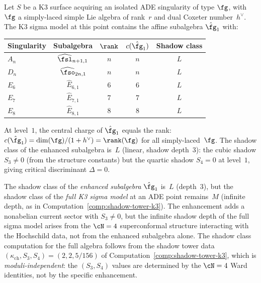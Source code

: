\begin{proposition}
\label{prop:k3-ade-enhancement}
Let $S$ be a K3 surface acquiring an isolated ADE singularity of
type $\fg$, with $\fg$ a simply-laced simple Lie algebra of rank~$r$
and dual Coxeter number~$h^\vee$.
The K3 sigma model at this point contains the affine subalgebra
$\hat{\fg}_1$ with:
\begin{center}
\renewcommand{\arraystretch}{1.3}
\begin{tabular}{lcccc}
\toprule
\textbf{Singularity} & \textbf{Subalgebra} & $\rank$ & $c(\hat{\fg}_1)$ & \textbf{Shadow class} \\
\midrule
$A_n$ & $\widehat{\fsl}_{n+1,1}$ & $n$ & $n$ & $L$ \\
$D_n$ & $\widehat{\fso}_{2n,1}$ & $n$ & $n$ & $L$ \\
$E_6$ & $\hat{E}_{6,1}$ & $6$ & $6$ & $L$ \\
$E_7$ & $\hat{E}_{7,1}$ & $7$ & $7$ & $L$ \\
$E_8$ & $\hat{E}_{8,1}$ & $8$ & $8$ & $L$ \\
\bottomrule
\end{tabular}
\end{center}
At level~$1$, the central charge of $\hat{\fg}_1$ equals the rank:
$c(\hat{\fg}_1) = \dim(\fg)/(1 + h^\vee) = \rank(\fg)$ for all
simply-laced~$\fg$. The shadow class of the enhanced subalgebra is~$L$
\textup{(}linear, shadow depth~$3$\textup{)}: the cubic shadow $S_3 \neq 0$
\textup{(}from the structure constants\textup{)} but the quartic shadow
$S_4 = 0$ at level~$1$, giving critical discriminant $\Delta = 0$.
\end{proposition}

\begin{remark}
\label{rem:k3-ade-shadow-subalgebra-vs-full}
The shadow class of the \emph{enhanced subalgebra} $\hat{\fg}_1$ is~$L$
(depth~$3$), but the shadow class of the \emph{full K3 sigma model}
at an ADE point remains~$M$ (infinite depth, as in
Computation~\ref{comp:shadow-tower-k3}). The enhancement adds
a nonabelian current sector with $S_3 \neq 0$, but the infinite
shadow depth of the full sigma model arises from the
$\cN = 4$ superconformal structure interacting with the
Hochschild data, not from the enhanced subalgebra alone.
The shadow class computation for the full algebra follows
from the shadow tower data $(\kappa_{\mathrm{ch}}, S_3, S_4) = (2, 2, 5/156)$
of Computation~\ref{comp:shadow-tower-k3}, which is
\emph{moduli-independent}: the $(S_3, S_4)$ values are determined
by the $\cN = 4$ Ward identities, not by the specific enhancement.
\end{remark}

